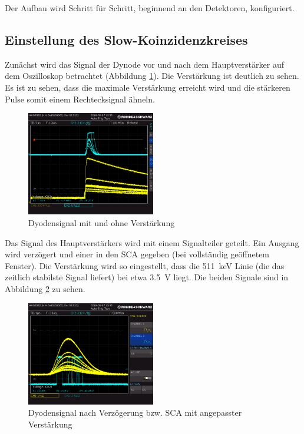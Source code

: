 Der Aufbau wird Schritt für Schritt, beginnend an den Detektoren, konfiguriert. 
\subsection{Einstellung des Slow-Koinzidenzkreises}
Zunächst wird das Signal der Dynode vor und nach dem Hauptverstärker auf dem Oszilloskop betrachtet (Abbildung \ref{fig:slow_mit_und_ohne_verstaerkung}). Die Verstärkung ist deutlich zu sehen. Es ist zu sehen, dass die maximale Verstärkung erreicht wird und die stärkeren Pulse somit einem Rechtecksignal ähneln.

\begin{figure}[h]
  \centering
  \includegraphics[width=0.5\textwidth]{data/oszi/slow_mit_und_ohne_verstaerkung.PNG}
  \caption{Dyodensignal mit und ohne Verstärkung}
  \label{fig:slow_mit_und_ohne_verstaerkung}
\end{figure}
Das Signal des Hauptverstärkers wird mit einem Signalteiler geteilt. Ein Ausgang wird verzögert und einer in den SCA gegeben (bei vollständig geöffnetem Fenster). Die Verstärkung wird so eingestellt, dass die \SI{511}{\kilo\electronvolt} Linie (die das zeitlich stabilste Signal liefert) bei etwa \SI{3.5}{\volt} liegt. Die beiden Signale sind in Abbildung \ref{fig:verstaerkung_auf_3-4v} zu sehen.
\begin{figure}[h]
  \centering
  \includegraphics[width=0.5\textwidth]{data/oszi/verstaerkung_auf_3-4v.PNG}
  \caption{Dyodensignal nach Verzögerung bzw. SCA mit angepasster Verstärkung}
  \label{fig:verstaerkung_auf_3-4v}
\end{figure}

